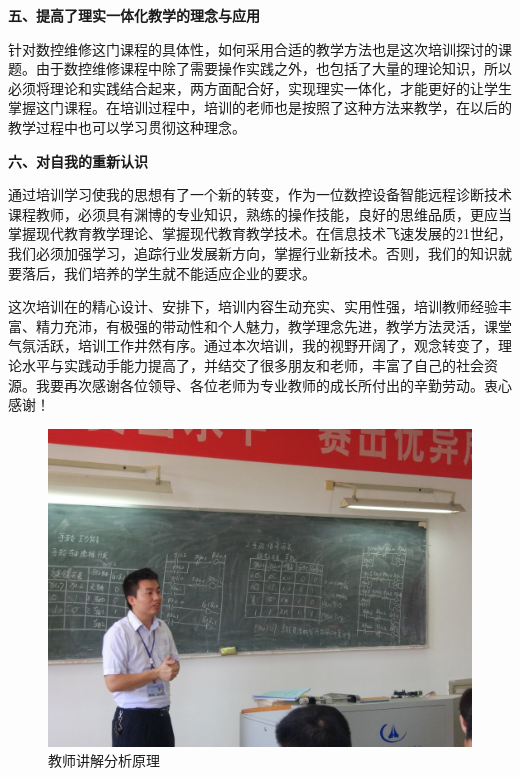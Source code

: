 \documentclass[12pt,a4paper]{ctexart}
\begin{document}
\textbf{五、提高了理实一体化教学的理念与应用}

针对数控维修这门课程的具体性，如何采用合适的教学方法也是这次培训探讨的课题。由于数控维修课程中除了需要操作实践之外，也包括了大量的理论知识，所以必须将理论和实践结合起来，两方面配合好，实现理实一体化，才能更好的让学生掌握这门课程。在培训过程中，培训的老师也是按照了这种方法来教学，在以后的教学过程中也可以学习贯彻这种理念。

\textbf{六、对自我的重新认识}

通过培训学习使我的思想有了一个新的转变，作为一位数控设备智能远程诊断技术课程教师，必须具有渊博的专业知识，熟练的操作技能，良好的思维品质，更应当掌握现代教育教学理论、掌握现代教育教学技术。在信息技术飞速发展的21世纪，我们必须加强学习，追踪行业发展新方向，掌握行业新技术。否则，我们的知识就要落后，我们培养的学生就不能适应企业的要求。


这次培训在的精心设计、安排下，培训内容生动充实、实用性强，培训教师经验丰富、精力充沛，有极强的带动性和个人魅力，教学理念先进，教学方法灵活，课堂气氛活跃，培训工作井然有序。通过本次培训，我的视野开阔了，观念转变了，理论水平与实践动手能力提高了，并结交了很多朋友和老师，丰富了自己的社会资源。我要再次感谢各位领导、各位老师为专业教师的成长所付出的辛勤劳动。衷心感谢！

\begin{figure}[h]
\begin{center}
		\includegraphics[width=0.8\linewidth]{image/1}
	\caption{教师讲解分析原理 }
\end{center}
\end{figure}
\end{document}
